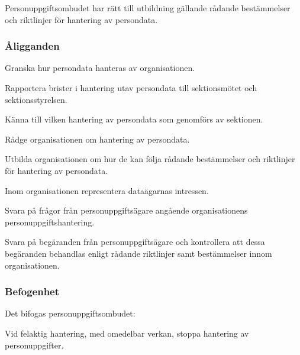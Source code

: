 Personuppgiftsombudet har rätt till utbildning gällande rådande bestämmelser och
riktlinjer för hantering av persondata.

\subsubsection{Åligganden}
\begin{att}
    \item  Granska hur persondata hanteras av organisationen.
    \item  Rapportera brister i hantering utav persondata till sektionsmötet och sektionsstyrelsen.
    \item  Känna till vilken hantering av persondata som genomförs av sektionen.
    \item  Rådge organisationen om hantering av persondata.
    \item  Utbilda organisationen om hur de kan följa rådande bestämmelser och riktlinjer för hantering av persondata.
    \item  Inom organisationen representera dataägarnas intressen.
    \item  Svara på frågor från personuppgiftsägare angående organisationens personuppgiftshantering.
    \item  Svara på begäranden från personuppgiftsägare och kontrollera att dessa begäranden
behandlas enligt rådande riktlinjer samt bestämmelser innom organisationen.
\end{att}

\subsubsection{Befogenhet}
Det bifogas personuppgiftsombudet:
\begin{att}
    \item  Vid felaktig hantering, med omedelbar verkan, stoppa hantering av personuppgifter.
\end{att}